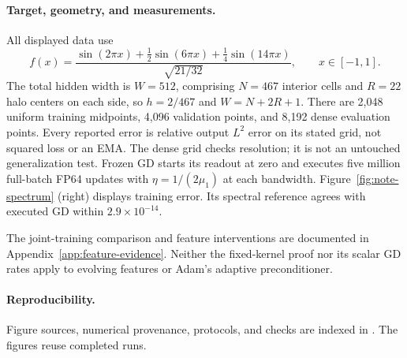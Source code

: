 \paragraph{Target, geometry, and measurements.}
All displayed data use
\begin{equation}
 f(x)=\frac{\sin(2\pi x)+\frac12\sin(6\pi x)+\frac14\sin(14\pi x)}
 {\sqrt{21/32}},\qquad x\in[-1,1].
\end{equation}
The total hidden width is $W=512$, comprising $N=467$ interior cells and
$R=22$ halo centers on each side, so $h=2/467$ and $W=N+2R+1$.
There are 2,048 uniform training midpoints, 4,096 validation points, and
8,192 dense evaluation points. Every reported error is relative output
$L^2$ error on its stated grid, not squared loss or an EMA.
The dense grid checks resolution; it is not an untouched generalization test.
Frozen GD starts its readout at zero and executes five million full-batch
FP64 updates with $\eta=1/(2\mu_1)$ at each bandwidth.
Figure~\ref{fig:note-spectrum} (right) displays training error. Its spectral
reference agrees with executed GD within $2.9\times10^{-14}$.

The joint-training comparison and feature interventions are documented in
Appendix~\ref{app:feature-evidence}. Neither the fixed-kernel proof nor its
scalar GD rates apply to evolving features or Adam's adaptive preconditioner.

\paragraph{Reproducibility.}
Figure sources, numerical provenance, protocols, and checks are indexed in
.
The figures reuse completed runs.
